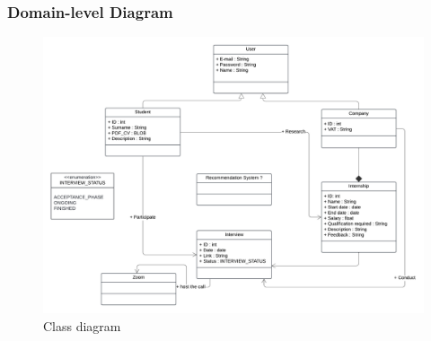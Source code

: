 \subsubsection{Domain-level Diagram}
\begin{figure}[H]
    \centering
    \includegraphics[width=\textwidth]{Images/Class diagram.png}
    \caption{Class diagram}
    \label{Class diagram}
\end{figure}

